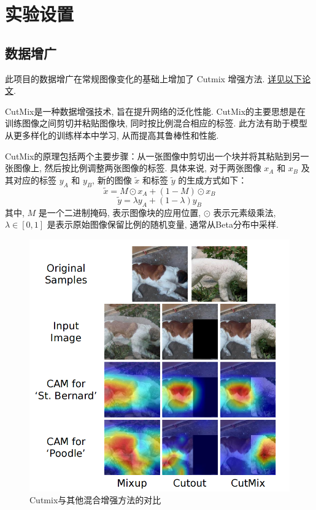 \documentclass[notitlepage,cs4size,punct,oneside]{ctexrep}
\numberwithin{equation}{chapter}
\theoremstyle{mystyle}
\begin{document}
\section{实验设置}
\subsection{数据增广}
此项目的数据增广在常规图像变化的基础上增加了 Cutmix 增强方法. \href{http://openaccess.thecvf.com/content_ICCV_2019/papers/Yun_CutMix_Regularization_Strategy_to_Train_Strong_Classifiers_With_Localizable_Features_ICCV_2019_paper.pdf}{详见以下论文}.

CutMix是一种数据增强技术, 旨在提升网络的泛化性能. CutMix的主要思想是在训练图像之间剪切并粘贴图像块, 同时按比例混合相应的标签. 此方法有助于模型从更多样化的训练样本中学习, 从而提高其鲁棒性和性能.

CutMix的原理包括两个主要步骤：从一张图像中剪切出一个块并将其粘贴到另一张图像上, 然后按比例调整两张图像的标签. 具体来说, 对于两张图像 $x_A$ 和 $x_B$ 及其对应的标签 $y_A$ 和 $y_B$, 新的图像 $\tilde{x}$ 和标签 $\tilde{y}$ 的生成方式如下：
\begin{equation}
\tilde{x} = M \odot x_A + (1 - M) \odot x_B
\end{equation}
\begin{equation}
\tilde{y} = \lambda y_A + (1 - \lambda) y_B
\end{equation}
其中, $M$ 是一个二进制掩码, 表示图像块的应用位置, $\odot$ 表示元素级乘法, $\lambda \in [0, 1]$ 是表示原始图像保留比例的随机变量, 通常从Beta分布中采样.
\begin{figure}[H]
    \centering
    \includegraphics[scale=0.7]{cutmix.png}
    \caption{Cutmix与其他混合增强方法的对比}
\end{figure}
\end{document}
